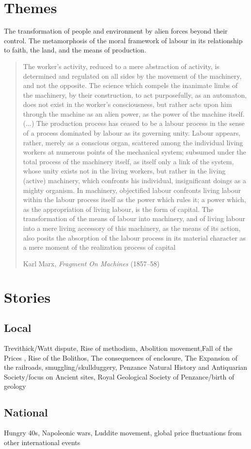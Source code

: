 \documentclass[12pt, a4paper]{scrreprt}
\begin{document}
	\section{Themes}
	The transformation of people and environment by alien forces beyond their control. The metamorphosis of the moral framework of labour in its relationship to faith, the land, and the means of production.
	\blockquote[Karl Marx, \emph{Fragment On Machines} (1857--58)][.]{
	The worker's activity, reduced to a mere abstraction of activity, is determined and regulated on all sides by the movement of the machinery, and not the opposite. The science which compels the inanimate limbs of the machinery, by their construction, to act purposefully, as an automaton, does not exist in the worker's consciousness, but rather acts upon him through the machine as an alien power, as the power of the machine itself. (...) The production process has ceased to be a labour process in the sense of a process dominated by labour as its governing unity. Labour appears, rather, merely as a conscious organ, scattered among the individual living workers at numerous points of the mechanical system; subsumed under the total process of the machinery itself, as itself only a link of the system, whose unity exists not in the living workers, but rather in the living (active) machinery, which confronts his individual, insignificant doings as a mighty organism. In machinery, objectified labour confronts living labour within the labour process itself as the power which rules it; a power which, as the appropriation of living labour, is the form of capital. The transformation of the means of labour into machinery, and of living labour into a mere living accessory of this machinery, as the means of its action, also posits the absorption of the labour process in its material character as a mere moment of the realization process of capital}
	\pagebreak
	\section{Stories}
	\subsection{Local}
	Trevithick/Watt dispute, Rise of methodism, Abolition movement,Fall of the Prices , Rise of the Bolithos, The consequences of enclosure, The Expansion of the railroads, smuggling/skullduggery, Penzance Natural History and Antiquarian Society/focus on Ancient sites, Royal Geological Society of Penzance/birth of geology
	\subsection{National}
	Hungry 40s, Napoleonic wars, Luddite movement, global price fluctuations from other international events
\end{document}
